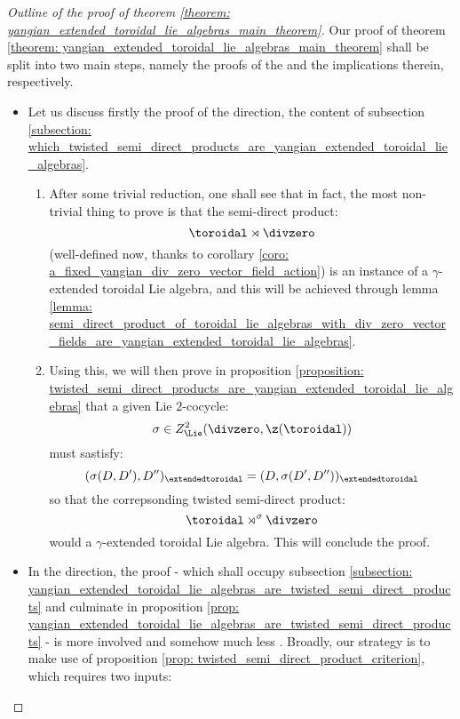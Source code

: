         \begin{proof}[Outline of the proof of theorem \ref{theorem: yangian_extended_toroidal_lie_algebras_main_theorem}]
            Our proof of theorem \ref{theorem: yangian_extended_toroidal_lie_algebras_main_theorem} shall be split into two main steps, namely the proofs of the  and the  implications therein, respectively.
            \begin{itemize}
                \item Let us discuss firstly the proof of the  direction, the content of subsection \ref{subsection: which_twisted_semi_direct_products_are_yangian_extended_toroidal_lie_algebras}.
                \begin{enumerate}
                    \item After some trivial reduction, one shall see that in fact, the most non-trivial thing to prove is that the semi-direct product:
                        $$\toroidal \rtimes \divzero$$
                    (well-defined now, thanks to corollary \ref{coro: a_fixed_yangian_div_zero_vector_field_action}) is an instance of a $\gamma$-extended toroidal Lie algebra, and this will be achieved through lemma \ref{lemma: semi_direct_product_of_toroidal_lie_algebras_with_div_zero_vector_fields_are_yangian_extended_toroidal_lie_algebras}. \item Using this, we will then prove in proposition \ref{proposition: twisted_semi_direct_products_are_yangian_extended_toroidal_lie_algebras} that a given Lie $2$-cocycle:
                        $$\sigma \in Z^2_{\Lie}(\divzero, \z(\toroidal))$$
                    must sastisfy:
                        $$( \sigma(D, D'), D'' )_{\extendedtoroidal} = ( D, \sigma(D', D'') )_{\extendedtoroidal}$$
                    so that the correpsonding twisted semi-direct product:
                        $$\toroidal \rtimes^{\sigma} \divzero$$
                    would a $\gamma$-extended toroidal Lie algebra. This will conclude the proof.
                \end{enumerate}
                \item In the  direction, the proof - which shall occupy subsection \ref{subsection: yangian_extended_toroidal_lie_algebras_are_twisted_semi_direct_products} and culminate in proposition \ref{prop: yangian_extended_toroidal_lie_algebras_are_twisted_semi_direct_products} - is more involved and somehow much less . Broadly, our strategy is to make use of proposition \ref{prop: twisted_semi_direct_product_criterion}, which requires two inputs:

\end{itemize}
\end{proof}
